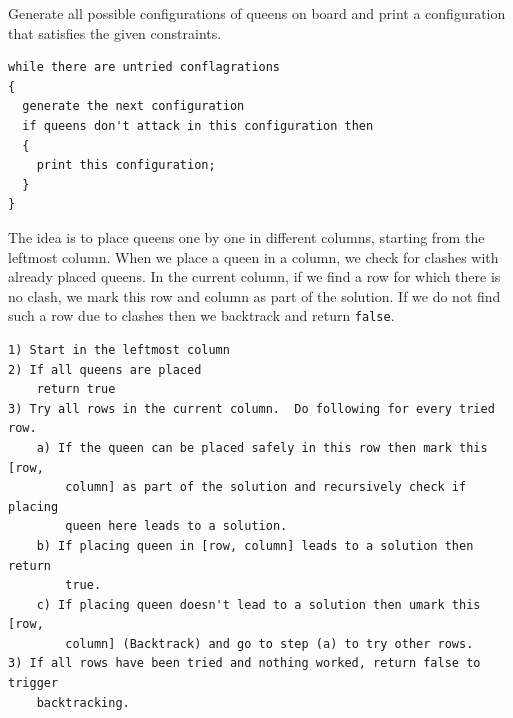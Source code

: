 \RayNotesEnd

\textbf{}


Generate all possible configurations of queens on board and print a
configuration that satisfies the given constraints.
\begin{lstlisting}[style=pseudostyle,numbers=none]
while there are untried conflagrations
{
  generate the next configuration
  if queens don't attack in this configuration then
  {
    print this configuration;
  }
}
\end{lstlisting}


The idea is to place queens one by one in different columns, starting from
the leftmost column. When we place a queen in a column, we check for clashes
with already placed queens. In the current column, if we find a row for
which there is no clash, we mark this row and column as part of the
solution. If we do not find such a row due to clashes then we backtrack and
return \texttt{false}.
\begin{lstlisting}[style=raygeneric]
1) Start in the leftmost column
2) If all queens are placed
    return true
3) Try all rows in the current column.  Do following for every tried row.
    a) If the queen can be placed safely in this row then mark this [row, 
        column] as part of the solution and recursively check if placing  
        queen here leads to a solution.
    b) If placing queen in [row, column] leads to a solution then return 
        true.
    c) If placing queen doesn't lead to a solution then umark this [row, 
        column] (Backtrack) and go to step (a) to try other rows.
3) If all rows have been tried and nothing worked, return false to trigger 
    backtracking.
\end{lstlisting}


